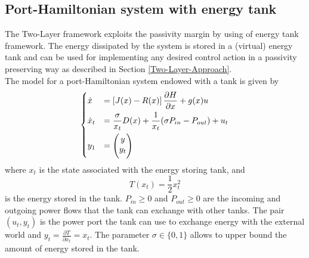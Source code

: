 \subsection{Port-Hamiltonian system with energy tank}\label{port_ham_system_with_tank}
The Two-Layer framework exploits the passivity margin by using of energy tank framework.
The energy dissipated by the system is stored in a (virtual) energy tank and can be used for implementing any desired control action in a passivity preserving way as described in Section \ref{Two-Layer-Approach}.\\
The model for a port-Hamiltonian system endowed with a tank is given by
\begin{equation}\label{Ham-Port-with-Tank}
		\begin{dcases}
	\dot{x} &= \left[ J(x)-R(x)\right] \dfrac{\partial H}{\partial x} + g(x)u\\
	\dot{x}_{t} &= \dfrac{\sigma}{x_{t}}D(x) + \dfrac{1}{x_{t}}(\sigma P_{in} - P_{out}) + u_{t}\\
	y_{1} &= 	\begin{pmatrix} y \\ \smallskip y_{t}\end{pmatrix}
	\end{dcases}
\end{equation}
where $x_{t}$ is the state associated with the energy storing tank, and 
\begin{equation}
	T(x_{t}) = \dfrac{1}{2}x^{2}_{t}
\end{equation}
is the energy stored in the tank.
$P_{in} \geq 0$ and $P_{out} \geq 0$ are the incoming and outgoing power flows that the tank can exchange with other tanks.
The pair $(u_{t}, y_{t})$ is the power port the tank can use to exchange energy with the external world and $y_{t} = \frac{\partial T}{\partial x_{t}} = x_{t}$. The parameter $\sigma \in \{0,1\}$ allows to upper bound the amount of energy stored in the tank.

